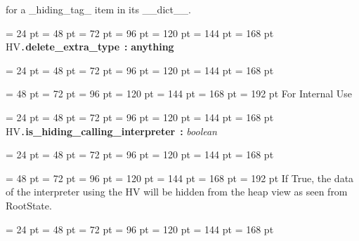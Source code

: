 {{{{\begin{itemize}
  for a {\_}hiding{\_}tag{\_} item in its {\_}{\_}dict{\_}{\_}.
\end{itemize}
\par}
\par}
\par}
{\par \noindent  \leftskip = 24 pt  \leftmargini = 48 pt  \leftmarginii = 72 pt  \leftmarginiii = 96 pt  \leftmarginiv = 120 pt  \leftmarginv = 144 pt  \leftmarginvi = 168 pt HV{\tt .\/}{\bf {\large {\bf delete{\_}extra{\_}type\/}}\/}~{\bf :} {\bf  anything\/}\par}
{\par \noindent  \leftskip = 24 pt  \leftmargini = 48 pt  \leftmarginii = 72 pt  \leftmarginiii = 96 pt  \leftmarginiv = 120 pt  \leftmarginv = 144 pt  \leftmarginvi = 168 pt {\par \noindent
{\par \noindent  \leftskip = 48 pt  \leftmargini = 72 pt  \leftmarginii = 96 pt  \leftmarginiii = 120 pt  \leftmarginiv = 144 pt  \leftmarginv = 168 pt  \leftmarginvi = 192 pt  For Internal Use
\par}
\par}
\par}
{\par \noindent  \leftskip = 24 pt  \leftmargini = 48 pt  \leftmarginii = 72 pt  \leftmarginiii = 96 pt  \leftmarginiv = 120 pt  \leftmarginv = 144 pt  \leftmarginvi = 168 pt HV{\tt .\/}{\bf {\large {\bf is{\_}hiding{\_}calling{\_}interpreter\/}}\/}~{\bf :}  {\em boolean\/}\par}
{\par \noindent  \leftskip = 24 pt  \leftmargini = 48 pt  \leftmarginii = 72 pt  \leftmarginiii = 96 pt  \leftmarginiv = 120 pt  \leftmarginv = 144 pt  \leftmarginvi = 168 pt {\par \noindent
{\par \noindent  \leftskip = 48 pt  \leftmargini = 72 pt  \leftmarginii = 96 pt  \leftmarginiii = 120 pt  \leftmarginiv = 144 pt  \leftmarginv = 168 pt  \leftmarginvi = 192 pt 
If True, the data of the interpreter using the HV will be hidden from
the heap view as seen from RootState.\par}
\par}
\par}
{\par \noindent  \leftskip = 24 pt  \leftmargini = 48 pt  \leftmarginii = 72 pt  \leftmarginiii = 96 pt  \leftmarginiv = 120 pt  \leftmarginv = 144 pt  \leftmarginvi = 168 pt {\par \noindent
}}}
